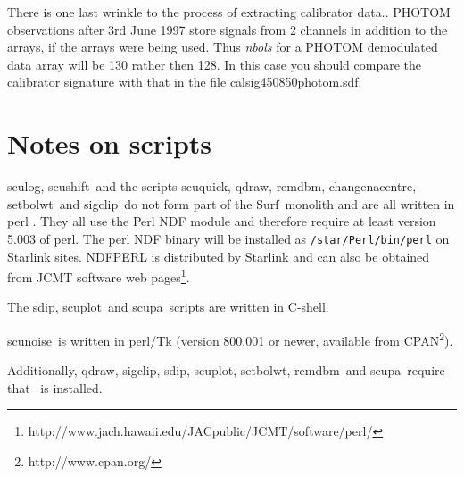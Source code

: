 \documentclass[twoside,11pt]{article}
\newcommand{\scusoft}          {{\sc Surf}}
\newcommand{\Kappa}{\xref{{\sc{Kappa}}}{sun95}{}}
\newcommand{\task}[1]{{\sf #1}}
\newcommand{\scuquick}{\htmlref{\task{scuquick}}{SCUQUICK}}
\newcommand{\sculog}{\htmlref{\task{sculog}}{SCULOG}}
\newcommand{\qdraw}{\htmlref{\task{qdraw}}{QDRAW}}
\newcommand{\sigclip}{\htmlref{\task{sigclip}}{SIGCLIP}}
\newcommand{\sdip}{\htmlref{\task{sdip}}{SDIP}}
\newcommand{\scupa}{\htmlref{\task{scupa}}{SCUPA}}
\newcommand{\scushift}{\htmlref{\task{scushift}}{SCUSHIFT}}
\newcommand{\scuplot}{\htmlref{\task{scuplot}}{SCUPLOT}}
\newcommand{\remdbm}{\htmlref{\task{remdbm}}{REMDBM}}
\newcommand{\chgnacent}{\htmlref{\task{change\_nacentre}}{CHANGE_NACENTRE}}
\newcommand{\scunoise}{\htmlref{\task{scunoise}}{SCUNOISE}}
\newcommand{\setbolwt}{\htmlref{\task{setbolwt}}{SETBOLWT}}
\newcommand{\htmladdnormallinkfoot}[2]{#1\footnote{#2}}
\newcommand{\htmlref}[2]{#1}
\newcommand{\xref}[3]{#1}
\newcommand{\xlabel}[1]{}
\renewcommand{\_}{\texttt{\symbol{95}}}
\begin{document}
There is one last wrinkle to the process of extracting calibrator
data.. PHOTOM observations after 3rd June 1997 store signals from 2 channels
in addition to the arrays, if the arrays were being used.  Thus
\textit{n\_bols} for a PHOTOM demodulated data array will be 130 rather then
128. In this case you should compare the calibrator signature with that in the
file calsig\_450\_850\_photom.sdf.

\section{\xlabel{ndfperl}Notes on scripts\label{ndfperl}}

\sculog, \scushift\ and the scripts \scuquick, \qdraw, \remdbm, \chgnacent,
\setbolwt\  and \sigclip\ do not form part of
the \scusoft\ monolith and are all written in perl \cite{Perl}. They all use
the \xref{Perl NDF module}{sun222}{} \cite{ndfperl} and therefore require at
least version 5.003 of perl. The perl NDF binary will be installed as
\texttt{/star/Perl/bin/perl} on Starlink sites.
\xref{NDFPERL}{sun222}{} is distributed by Starlink and 
can also be obtained from
\htmladdnormallinkfoot{JCMT software web pages}{http://www.jach.hawaii.edu/JACpublic/JCMT/software/perl/}.

The \sdip, \scuplot\ and \scupa\ scripts are written in C-shell.

\scunoise\ is written in perl/Tk (version 800.001 or newer, available from
\htmladdnormallinkfoot{CPAN}{http://www.cpan.org/}).

Additionally, \qdraw, \sigclip, \sdip, \scuplot, \setbolwt, \remdbm\ and 
\scupa\ require that \Kappa\ is installed.
\end{document}
